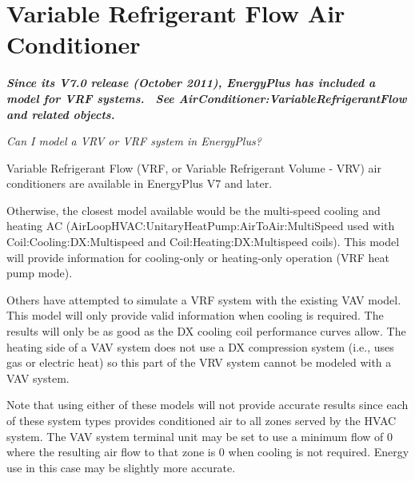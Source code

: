 \section{Variable Refrigerant Flow Air Conditioner}\label{variable-refrigerant-flow-air-conditioner}

\textbf{\emph{Since its V7.0 release (October 2011), EnergyPlus has included a model for VRF systems.~ See AirConditioner:VariableRefrigerantFlow and related objects.}}

\emph{Can I model a VRV or VRF system in EnergyPlus?}

Variable Refrigerant Flow (VRF, or Variable Refrigerant Volume - VRV) air conditioners are available in EnergyPlus V7 and later.

Otherwise, the closest model available would be the multi-speed cooling and heating AC (AirLoopHVAC:UnitaryHeatPump:AirToAir:MultiSpeed used with Coil:Cooling:DX:Multispeed and Coil:Heating:DX:Multispeed coils). This model will provide information for cooling-only or heating-only operation (VRF heat pump mode).

Others have attempted to simulate a VRF system with the existing VAV model. This model will only provide valid information when cooling is required. The results will only be as good as the DX cooling coil performance curves allow. The heating side of a VAV system does not use a DX compression system (i.e., uses gas or electric heat) so this part of the VRV system cannot be modeled with a VAV system.

Note that using either of these models will not provide accurate results since each of these system types provides conditioned air to all zones served by the HVAC system. The VAV system terminal unit may be set to use a minimum flow of 0 where the resulting air flow to that zone is 0 when cooling is not required. Energy use in this case may be slightly more accurate.
